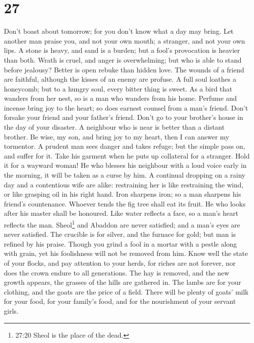\hypertarget{section-22}{%
\section{27}\label{section-22}}

 Don't boast about tomorrow; for you don't know what a day
may bring.  Let another man praise you, and not your own
mouth; a stranger, and not your own lips.  A stone is heavy,
and sand is a burden; but a fool's provocation is heavier than both.
 Wrath is cruel, and anger is overwhelming; but who is able
to stand before jealousy?  Better is open rebuke than hidden
love.  The wounds of a friend are faithful, although the
kisses of an enemy are profuse.  A full soul loathes a
honeycomb; but to a hungry soul, every bitter thing is sweet.
 As a bird that wanders from her nest, so is a man who
wanders from his home.  Perfume and incense bring joy to the
heart; so does earnest counsel from a man's friend.  Don't
forsake your friend and your father's friend. Don't go to your brother's
house in the day of your disaster. A neighbour who is near is better
than a distant brother.  Be wise, my son, and bring joy to
my heart, then I can answer my tormentor.  A prudent man
sees danger and takes refuge; but the simple pass on, and suffer for it.
 Take his garment when he puts up collateral for a
stranger. Hold it for a wayward woman!  He who blesses his
neighbour with a loud voice early in the morning, it will be taken as a
curse by him.  A continual dropping on a rainy day and a
contentious wife are alike:  restraining her is like
restraining the wind, or like grasping oil in his right hand.
 Iron sharpens iron; so a man sharpens his friend's
countenance.  Whoever tends the fig tree shall eat its
fruit. He who looks after his master shall be honoured. 
Like water reflects a face, so a man's heart reflects the man.
 Sheol\footnote{27:20 Sheol is the place of the dead.} and
Abaddon are never satisfied; and a man's eyes are never satisfied.
 The crucible is for silver, and the furnace for gold; but
man is refined by his praise.  Though you grind a fool in a
mortar with a pestle along with grain, yet his foolishness will not be
removed from him.  Know well the state of your flocks, and
pay attention to your herds,  for riches are not forever,
nor does the crown endure to all generations.  The hay is
removed, and the new growth appears, the grasses of the hills are
gathered in.  The lambs are for your clothing, and the
goats are the price of a field.  There will be plenty of
goats' milk for your food, for your family's food, and for the
nourishment of your servant girls.

